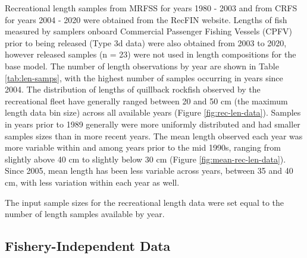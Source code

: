 \documentclass[11pt,
  english,
  letterpaper,
]{article}
\begin{document}
\leavevmode\tagmcend\tagstructend


Recreational length samples from MRFSS for years 1980 - 2003 and from CRFS for years 2004 - 2020 were obtained from the RecFIN website. Lengths of fish measured by samplers onboard Commercial Passenger Fishing Vessels (CPFV) prior to being released (Type 3d data) were also obtained from 2003 to 2020, however released samples (n = 23) were not used in length compositions for the base model. The number of length observations by year are shown in Table \ref{tab:len-samps}, with the highest number of samples occurring in years since 2004. The distribution of lengths of quillback rockfish observed by the recreational fleet have generally ranged between 20 and 50 cm (the maximum length data bin size) across all available years (Figure \ref{fig:rec-len-data}). Samples in years prior to 1989 generally were more uniformly distributed and had smaller samples sizes than in more recent years. The mean length observed each year was more variable within and among years prior to the mid 1990s, ranging from slightly above 40 cm to slightly below 30 cm (Figure \ref{fig:mean-rec-len-data}). Since 2005, mean length has been less variable across years, between 35 and 40 cm, with less variation within each year as well.

\leavevmode\tagmcend\tagstructend\par


The input sample sizes for the recreational length data were set equal to the number of length samples available by year.

\leavevmode\tagmcend\tagstructend\par


\hypertarget{fishery-independent-data}{%
\subsection{Fishery-Independent Data}\label{fishery-independent-data}}

\leavevmode\tagmcend\tagstructend

\end{document}
